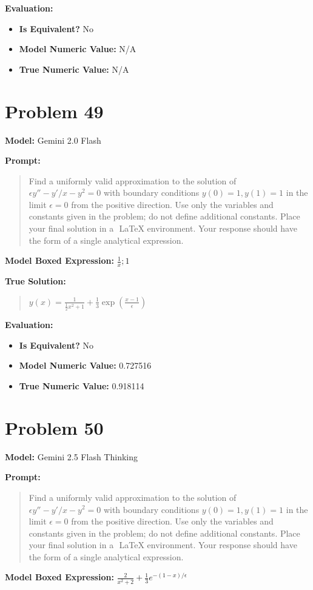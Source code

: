 \documentclass{article}
\begin{document}
\textbf{Evaluation:}
\begin{itemize}
\item \textbf{Is Equivalent?} No
\item \textbf{Model Numeric Value:} N/A
\item \textbf{True Numeric Value:} N/A
\end{itemize}
\vspace{1cm}
\section*{Problem 49}
\textbf{Model:} Gemini 2.0 Flash

\textbf{Prompt:}
\begin{quote}
Find a uniformly valid approximation to the solution of $\epsilon y'' - y'/x - y^2 = 0$ with boundary conditions $y(0) = 1, y(1) = 1$ in the limit $\epsilon = 0$ from the positive direction. Use only the variables and constants given in the problem; do not define additional constants. Place your final solution in a $\boxed{}$ LaTeX environment. Your response should have the form of a single analytical expression.
\end{quote}
\textbf{Model Boxed Expression:} $\frac{1}{x}; 1$

\textbf{True Solution:}
\begin{quote}
$y(x) = \frac{1}{\frac{1}{2}x^2 + 1} + \frac{1}{3} \exp(\frac{x-1}{\epsilon})$
\end{quote}

\textbf{Evaluation:}
\begin{itemize}
\item \textbf{Is Equivalent?} No
\item \textbf{Model Numeric Value:} 0.727516
\item \textbf{True Numeric Value:} 0.918114
\end{itemize}
\vspace{1cm}
\section*{Problem 50}
\textbf{Model:} Gemini 2.5 Flash Thinking

\textbf{Prompt:}
\begin{quote}
Find a uniformly valid approximation to the solution of $\epsilon y'' - y'/x - y^2 = 0$ with boundary conditions $y(0) = 1, y(1) = 1$ in the limit $\epsilon = 0$ from the positive direction. Use only the variables and constants given in the problem; do not define additional constants. Place your final solution in a $\boxed{}$ LaTeX environment. Your response should have the form of a single analytical expression.
\end{quote}
\textbf{Model Boxed Expression:} $\frac{2}{x^2+2} + \frac{1}{3}e^{-(1-x)/\epsilon}$
\end{document}
